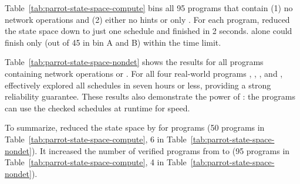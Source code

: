 


Table~\ref{tab:parrot-state-space-compute} bins all 95 programs that contain
(1) no network operations and (2) either no hints or only \computes. For each program,
\ecosys reduced the state space down to just one
schedule and finished in 2 seconds. \dbug alone could finish only
\nprogverifieddbug (out of 45 in bin A and B) within the time limit.


Table~\ref{tab:parrot-state-space-nondet} shows the results for all
\nprognondetandnetwork programs containing network operations or
\nondets.  For all four real-world programs \pfscan, \partition,
\nthelement, and \partialsort, \ecosys effectively explored all
schedules in seven hours or less, providing a strong reliability
guarantee.  These results also demonstrate the power of \parrot:
the programs can use the checked schedules at runtime for speed.

To summarize, \parrot reduced the state space by \shrinkscale for
\nprogshrink programs (50 programs in Table~\ref{tab:parrot-state-space-compute},
6 in Table~\ref{tab:parrot-state-space-nondet}).  It increased the number of
verified programs from \nprogverifieddbug to \nprogverifiedxxx (95
programs in Table~\ref{tab:parrot-state-space-compute}, 4 in
Table~\ref{tab:parrot-state-space-nondet}).




